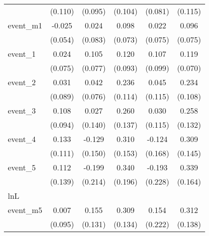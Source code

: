 {\begin{tabular}{l*{5}{c}}
            &     (0.110)         &     (0.095)         &     (0.104)         &     (0.081)         &     (0.115)         \\
[1em]
event\_m1    &      -0.025         &       0.024         &       0.098         &       0.022         &       0.096         \\
            &     (0.054)         &     (0.083)         &     (0.073)         &     (0.075)         &     (0.075)         \\
[1em]
event\_1     &       0.024         &       0.105         &       0.120         &       0.107         &       0.119         \\
            &     (0.075)         &     (0.077)         &     (0.093)         &     (0.099)         &     (0.070)         \\
[1em]
event\_2     &       0.031         &       0.042         &       0.236\sym{*}  &       0.045         &       0.234\sym{*}  \\
            &     (0.089)         &     (0.076)         &     (0.114)         &     (0.115)         &     (0.108)         \\
[1em]
event\_3     &       0.108         &       0.027         &       0.260         &       0.030         &       0.258         \\
            &     (0.094)         &     (0.140)         &     (0.137)         &     (0.115)         &     (0.132)         \\
[1em]
event\_4     &       0.133         &      -0.129         &       0.310\sym{*}  &      -0.124         &       0.309\sym{*}  \\
            &     (0.111)         &     (0.150)         &     (0.153)         &     (0.168)         &     (0.145)         \\
[1em]
event\_5     &       0.112         &      -0.199         &       0.340         &      -0.193         &       0.339\sym{*}  \\
            &     (0.139)         &     (0.214)         &     (0.196)         &     (0.228)         &     (0.164)         \\
\hline
lnL         &                     &                     &                     &                     &                     \\
event\_m5    &       0.007         &       0.155         &       0.309\sym{*}  &       0.154         &       0.312\sym{*}  \\
            &     (0.095)         &     (0.131)         &     (0.134)         &     (0.222)         &     (0.138)         \\

\end{tabular}}
